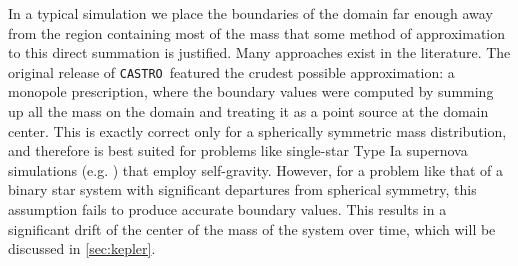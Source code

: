 \documentclass[iop]{../emulateapj}
\newcommand{\castro}{\texttt{CASTRO}}
\begin{document}
In a typical simulation we place the boundaries of the domain far
enough away from the region containing most of the mass that some
method of approximation to this direct summation is justified. Many
approaches exist in the literature. The original release of \castro\
featured the crudest possible approximation: a monopole prescription,
where the boundary values were computed by summing up all the mass on
the domain and treating it as a point source at the domain
center. This is exactly correct only for a spherically symmetric mass
distribution, and therefore is best suited for problems like
single-star Type Ia supernova simulations (e.g. \cite{malone:2014})
that employ self-gravity. However, for a problem like that of a binary star system
with significant departures from spherical symmetry, this assumption
fails to produce accurate boundary values. This results in a
significant drift of the center of the mass of the system over time,
which will be discussed in \autoref{sec:kepler}.
\end{document}
